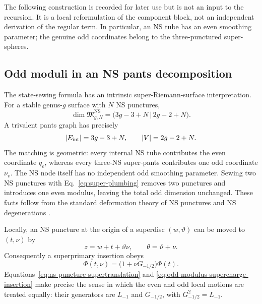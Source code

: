 \documentclass[11pt]{article}
\newcommand{\NS}{\mathrm{NS}}
\begin{document}
The following construction is recorded for later use but is not an input to
the recursion.  It is a local reformulation of the component block, not an
independent derivation of the regular term.  In particular, an NS tube has
an even smoothing parameter; the genuine odd coordinates belong to the
three-punctured super-spheres.

\subsection{Odd moduli in an NS pants decomposition}
\label{sec:genuine-supermoduli-block}

The state-sewing formula has an intrinsic super-Riemann-surface
interpretation.  For a stable genus-\(g\) surface with \(N\) NS punctures,
\begin{equation}
 \dim\mathfrak M_{g,N}^{\NS}
 =\bigl(3g-3+N\,\big|\,2g-2+N\bigr).
 \label{eq:ns-supermoduli-dimension}
\end{equation}
A trivalent pants graph has precisely
\begin{equation}
 |E_{\rm int}|=3g-3+N,
 \qquad
 |V|=2g-2+N.
 \label{eq:pants-supermoduli-count}
\end{equation}
The matching is geometric: every internal NS tube contributes the even
coordinate \(q_e\), whereas every three-NS super-pants contributes one odd
coordinate \(\nu_v\).  The NS node itself has no independent odd smoothing
parameter.  Sewing two NS punctures with
Eq.~\eqref{eq:super-plumbing} removes two punctures and introduces one even
modulus, leaving the total odd dimension unchanged.  These facts follow
from the standard deformation theory of NS punctures and NS degenerations
\cite{Witten2012SuperRiemannSurfaces,YinFoundationsStringTheory}.

Locally, an NS puncture at the origin of a superdisc \((w,\vartheta)\) can be
moved to \((t,\nu)\) by
\begin{equation}
 z=w+t+\vartheta\nu,
 \qquad
 \theta=\vartheta+\nu.
 \label{eq:ns-puncture-supertranslation}
\end{equation}
Consequently a superprimary insertion obeys
\begin{equation}
 \Phi(t,\nu)
 =\bigl(1+\nu G_{-1/2}\bigr)\Phi(t).
 \label{eq:odd-modulus-supercharge-insertion}
\end{equation}
Equations~\eqref{eq:ns-puncture-supertranslation} and
\eqref{eq:odd-modulus-supercharge-insertion} make precise the sense in which
the even and odd local motions are treated equally: their generators are
\(L_{-1}\) and \(G_{-1/2}\), with
\(G_{-1/2}^2=L_{-1}\).
\end{document}
